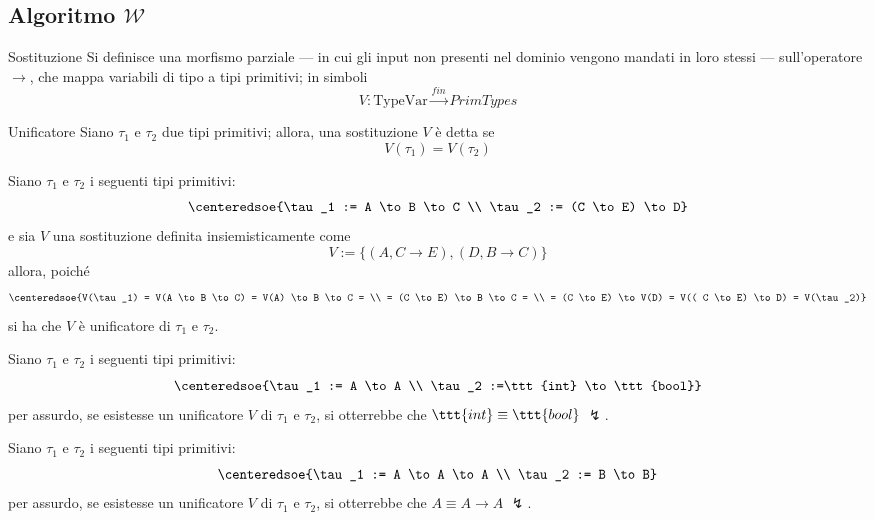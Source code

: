\documentclass[a4paper, 12pt]{report}
\begin{document}
    \subsection{Algoritmo $\mathcal{W}$}

    \begin{frameddefn}{Sostituzione}
        Si definisce  una morfismo parziale --- in cui gli input non presenti nel dominio vengono mandati in loro stessi --- sull'operatore $\to$, che mappa variabili di tipo a tipi primitivi; in simboli $$V: \mathrm{TypeVar} \stackrel{fin}{\to} PrimTypes$$
    \end{frameddefn}

    \begin{frameddefn}{Unificatore}
        Siano $\tau_1$ e $\tau_2$ due tipi primitivi; allora, una sostituzione $V$ è detta  se $$V(\tau_1) = V(\tau_2)$$
    \end{frameddefn}

    \begin{example}[Unificatori]
        Siano $\tau_1$ e $\tau_2$ i seguenti tipi primitivi: $$\centeredsoe{\tau_1 := A \to B \to C \\ \tau_2 := (C \to E) \to D}$$ e sia $V$ una sostituzione definita insiemisticamente come $$V := \{(A, C \to E), (D, B \to C)\}$$ allora, poiché $$\centeredsoe{V(\tau_1) = V(A \to B \to C) = V(A) \to B \to C = \\ = (C \to E) \to B \to C = \\ =  (C \to E) \to V(D) = V(( C \to E) \to D) =  V(\tau_2)}$$ si ha che $V$ è unificatore di $\tau_1$ e $\tau_2$.
    \end{example}

    \begin{nonexample}[Unificatori]
        Siano $\tau_1$ e $\tau_2$ i seguenti tipi primitivi: $$\centeredsoe{\tau_1 := A \to A \\ \tau_2 :=\ttt{int} \to \ttt{bool}}$$ per assurdo, se esistesse un unificatore $V$ di $\tau_1$ e $\tau_2$, si otterrebbe che $\ttt{int} \equiv \ttt{bool}$ $\lightning$.
    \end{nonexample}

    \begin{nonexample}[Unificatori]
        Siano $\tau_1$ e $\tau_2$ i seguenti tipi primitivi: $$\centeredsoe{\tau_1 := A \to A \to A \\ \tau_2 := B \to B}$$ per assurdo, se esistesse un unificatore $V$ di $\tau_1$ e $\tau_2$, si otterrebbe che $A \equiv A \to A$ $\lightning$.
    \end{nonexample}
\end{document}
